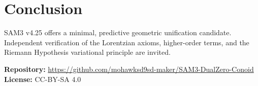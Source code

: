 \documentclass[11pt,a4paper]{article}
\begin{document}
\section{Conclusion}

SAM3 v4.25 offers a minimal, predictive geometric unification candidate. Independent verification of the Lorentzian axioms, higher-order terms, and the Riemann Hypothesis variational principle are invited.

\textbf{Repository:} \url{https://github.com/mohawksd9sd-maker/SAM3-DualZero-Conoid} \\
\textbf{License:} CC-BY-SA 4.0
\end{document}
